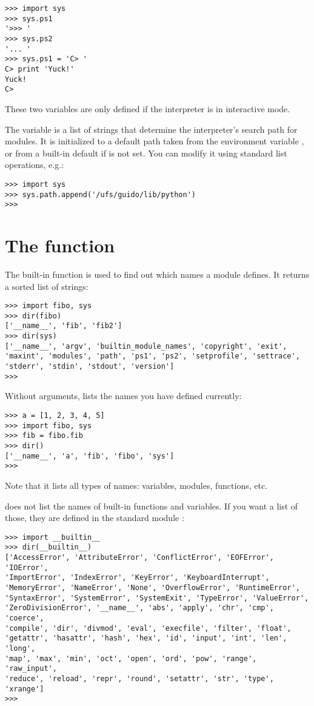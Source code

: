 \bcode\begin{verbatim}
>>> import sys
>>> sys.ps1
'>>> '
>>> sys.ps2
'... '
>>> sys.ps1 = 'C> '
C> print 'Yuck!'
Yuck!
C> 
\end{verbatim}\ecode
%
These two variables are only defined if the interpreter is in
interactive mode.

The variable
is a list of strings that determine the interpreter's search path for
modules.
It is initialized to a default path taken from the environment variable
,
or from a built-in default if
is not set.
You can modify it using standard list operations, e.g.:

\bcode\begin{verbatim}
>>> import sys
>>> sys.path.append('/ufs/guido/lib/python')
>>> 
\end{verbatim}\ecode

\section{The  function}

The built-in function  is used to find out which names a module
defines.  It returns a sorted list of strings:

\bcode\begin{verbatim}
>>> import fibo, sys
>>> dir(fibo)
['__name__', 'fib', 'fib2']
>>> dir(sys)
['__name__', 'argv', 'builtin_module_names', 'copyright', 'exit',
'maxint', 'modules', 'path', 'ps1', 'ps2', 'setprofile', 'settrace',
'stderr', 'stdin', 'stdout', 'version']
>>>
\end{verbatim}\ecode
%
Without arguments,  lists the names you have defined currently:

\bcode\begin{verbatim}
>>> a = [1, 2, 3, 4, 5]
>>> import fibo, sys
>>> fib = fibo.fib
>>> dir()
['__name__', 'a', 'fib', 'fibo', 'sys']
>>>
\end{verbatim}\ecode
%
Note that it lists all types of names: variables, modules, functions, etc.

 does not list the names of built-in functions and variables.
If you want a list of those, they are defined in the standard module
:

\bcode\begin{verbatim}
>>> import __builtin__
>>> dir(__builtin__)
['AccessError', 'AttributeError', 'ConflictError', 'EOFError', 'IOError',
'ImportError', 'IndexError', 'KeyError', 'KeyboardInterrupt',
'MemoryError', 'NameError', 'None', 'OverflowError', 'RuntimeError',
'SyntaxError', 'SystemError', 'SystemExit', 'TypeError', 'ValueError',
'ZeroDivisionError', '__name__', 'abs', 'apply', 'chr', 'cmp', 'coerce',
'compile', 'dir', 'divmod', 'eval', 'execfile', 'filter', 'float',
'getattr', 'hasattr', 'hash', 'hex', 'id', 'input', 'int', 'len', 'long',
'map', 'max', 'min', 'oct', 'open', 'ord', 'pow', 'range', 'raw_input',
'reduce', 'reload', 'repr', 'round', 'setattr', 'str', 'type', 'xrange']
>>>
\end{verbatim}\ecode



